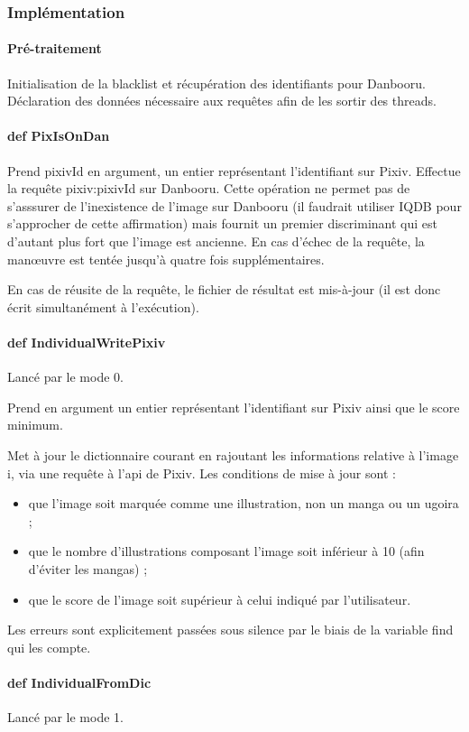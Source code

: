 \documentclass[a4paper,12pt]{article}
\begin{document}
\subsubsection{Implémentation}
\paragraph{Pré-traitement}
Initialisation de la blacklist et récupération des identifiants pour Danbooru. Déclaration des données nécessaire aux requêtes afin de les sortir des threads.
\paragraph{def PixIsOnDan}
Prend pixivId en argument, un entier représentant l'identifiant sur Pixiv. Effectue la requête pixiv:pixivId sur Danbooru. Cette opération ne permet pas de s'asssurer de l'inexistence de l'image sur Danbooru (il faudrait utiliser IQDB pour s'approcher de cette affirmation) mais fournit un premier discriminant qui est d'autant plus fort que l'image est ancienne. En cas d'échec de la requête, la manœuvre est tentée jusqu'à quatre fois supplémentaires.

En cas de réusite de la requête, le fichier de résultat est mis-à-jour (il est donc écrit simultanément à l'exécution).
\paragraph{def IndividualWritePixiv}
Lancé par le mode 0.

Prend en argument un entier représentant l'identifiant sur Pixiv ainsi que le score minimum.

Met à jour le dictionnaire courant en rajoutant les informations relative à l'image i, via une requête à l'api de Pixiv.
Les conditions de mise à jour sont :
\begin{itemize}
\item que l'image soit marquée comme une illustration, non un manga ou un ugoira ; 
\item que le nombre d'illustrations composant l'image soit inférieur à 10 (afin d'éviter les mangas) ;
\item que le score de l'image soit supérieur à celui indiqué par l'utilisateur.
\end{itemize}

Les erreurs sont explicitement passées sous silence par le biais de la variable \og find \fg{} qui les compte.
\paragraph{def IndividualFromDic}
Lancé par le mode 1.
\end{document}
